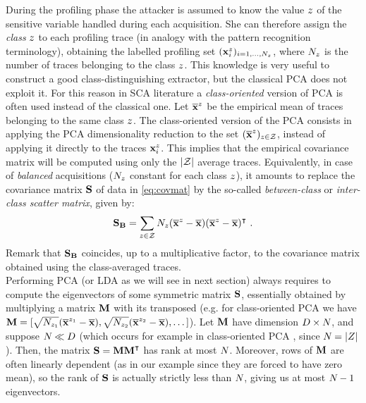 During the profiling phase the attacker is assumed to know the value $\sensVar$ of the sensitive variable handled during each acquisition. She can therefore assign the {\em class} $\sensVar$ to each profiling trace  (in analogy with the pattern recognition terminology), obtaining the labelled profiling set $(\sss{i})_{i=1,\dots,\numTraces}$, where $\numTraces$ is the number of traces belonging to the class $\sensVar$. This knowledge is very useful to construct a good class-distinguishing extractor, but the classical PCA does not exploit it. For this reason in SCA literature \cite{TAprincipal,choudaryefficient,choudary2014efficient,disassembler,Standaert2008}  a {\em class-oriented} version of PCA is often used instead of the classical one. Let $\mmmXclass$ be the empirical mean of traces belonging to the same class $\sensVar$. The class-oriented version of the PCA  consists in applying the PCA dimensionality reduction to the set $(\mmmXclass)_{\sensVar \in \sensVarSet}$, instead of applying it directly to the traces $\sss{i}$. This implies that the empirical covariance matrix will be computed using only the $\lvert \sensVarSet \rvert$ average traces. Equivalently, in case of \textit{balanced} acquisitions ($\numTraces$ constant for each class $\sensVar$), it amounts to replace the covariance matrix $\covmat$ of data in \eqref{eq:covmat}  by the so-called {\em between-class} or  {\em inter-class scatter matrix}, given by:
\begin{equation}\label{eq:SB}
\SB = \sum_{\sensVar\in\sensVarSet}\numTraces(\mmmXclass-\mmmX)(\mmmXclass-\mmmX)^\intercal \mbox{ .}
\end{equation}
Remark that $\SB$ coincides, up to a multiplicative factor, to the covariance matrix obtained using the class-averaged traces.\\

Performing PCA (or LDA as we will see in next section) always requires to compute the eigenvectors of some symmetric matrix $\covmat$, essentially obtained by multiplying a matrix $\measuresMatrix$ with its transposed (e.g. for class-oriented PCA we have $\measuresMatrix = [\sqrt{\numTraces[\sensVar_1]}(\mmmXclass[\sensVar_1]-\mmmX),\sqrt{\numTraces[\sensVar_2]}(\mmmXclass[\sensVar_2]-\mmmX), \dots ]$). Let $\measuresMatrix$ have dimension $\traceLength\times\numTraces[]$, and suppose $\numTraces[]\ll \traceLength$ (which occurs for example in class-oriented PCA , since $\numTraces[]=\lvert \sensRandVar \rvert$). Then, the matrix $\covmat=\measuresMatrix\measuresMatrix^\intercal$ has rank at most $\numTraces[]$. Moreover, rows of $\measuresMatrix$ are often linearly dependent (as in our example since they are forced to have zero mean), so the rank of $\covmat$ is actually strictly less than $\numTraces[]$, giving us at most $\numTraces[]-1$ eigenvectors.\\

